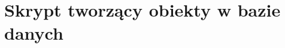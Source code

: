 \section{Skrypt tworzący obiekty w bazie danych}





\newpage



\newpage



\newpage



\newpage



\newpage



\newpage

